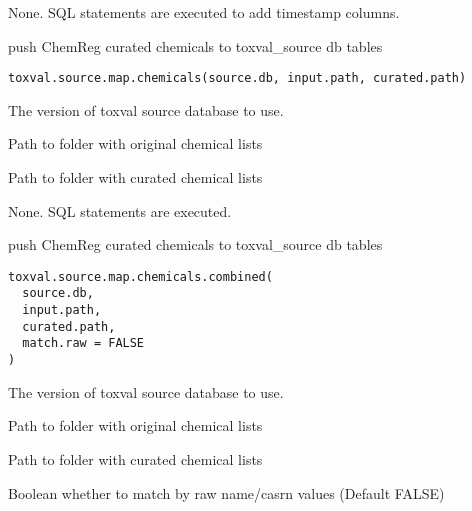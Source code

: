 \documentclass[letterpaper]{book}
\begin{document}
%
\begin{Value}
None. SQL statements are executed to add timestamp columns.
\end{Value}
%
\begin{Description}\relax
push ChemReg curated chemicals to toxval\_source db tables
\end{Description}
%
\begin{Usage}
\begin{verbatim}
toxval.source.map.chemicals(source.db, input.path, curated.path)
\end{verbatim}
\end{Usage}
%
\begin{Arguments}
\begin{ldescription}
\item[\code{source.db}] The version of toxval source database to use.

\item[\code{input.path}] Path to folder with original chemical lists

\item[\code{curated.path}] Path to folder with curated chemical lists
\end{ldescription}
\end{Arguments}
%
\begin{Value}
None. SQL statements are executed.
\end{Value}
%
\begin{Description}\relax
push ChemReg curated chemicals to toxval\_source db tables
\end{Description}
%
\begin{Usage}
\begin{verbatim}
toxval.source.map.chemicals.combined(
  source.db,
  input.path,
  curated.path,
  match.raw = FALSE
)
\end{verbatim}
\end{Usage}
%
\begin{Arguments}
\begin{ldescription}
\item[\code{source.db}] The version of toxval source database to use.

\item[\code{input.path}] Path to folder with original chemical lists

\item[\code{curated.path}] Path to folder with curated chemical lists

\item[\code{match.raw}] Boolean whether to match by raw name/casrn values (Default FALSE)
\end{ldescription}
\end{Arguments}
\end{document}
